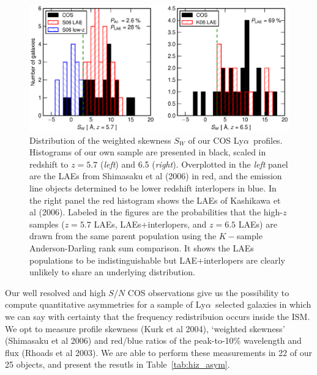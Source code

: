 \documentclass[manuscript]{emulateapj}
\newcommand{\lya}{Ly$\alpha$}
\begin{document}
\begin{figure}[t!]
   \centering
   \includegraphics[scale=.8]{asym_hist.eps}
   \caption{Distribution of the weighted skewness $S_W$ of our COS \lya\ 
	profiles. Histograms of our own sample are presented in black, scaled 
	in redshift to $z=5.7$ (\emph{left}) and 6.5 (\emph{right}). Overplotted
	in the \emph{left} panel are the LAEs from Shimasaku et al (2006) in red,
 and the emission line objects determined to be lower redshift interlopers in
	blue. In the right panel the red histogram shows the LAEs of Kashikawa et
	al (2006). Labeled in the figures are the probabilities that the 
	high-$z$ samples ($z=5.7$ LAEs, LAEs+interlopers, and $z=6.5$ LAEs) are drawn
	from the same parent population using the $K-$sample Anderson-Darling rank
	sum comparison. It shows the LAEs populations to be indistinguishable but 
	LAE+interlopers are clearly unlikely to share an underlying distribution.
	 }
   \label{fig:skew}
\end{figure}

Our well resolved and high $S/N$ COS observations give us the possibility
to compute quantitative asymmetries for a sample of \lya\ selected galaxies
in which we can say with certainty that the frequency redistribuion occurs 
inside the ISM. We opt to measure profile skewness (Kurk et al 2004), 
`weighted skewness' (Shimasaku et al 2006) and red/blue ratios of the 
peak-to-10\% wavelength and flux (Rhoads et al 2003). We are able to perform
these measurements in 22 of our 25 objects, and present the resutls in 
Table~\ref{tab:hiz_asym}. 
\end{document}
